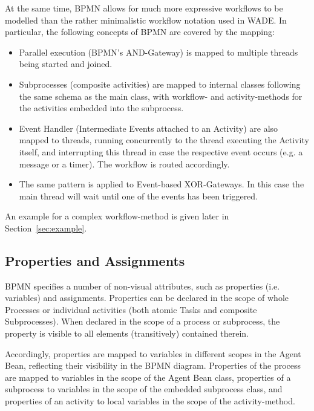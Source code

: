 At the same time, BPMN allows for much more expressive workflows to be modelled
than the rather minimalistic workflow notation used in WADE.  In particular, the
following concepts of BPMN are covered by the mapping:

\begin{itemize}
	\item Parallel execution (BPMN's AND-Gateway) is mapped to multiple threads
	being started and joined.
	
	\item Subprocesses (composite activities) are mapped to internal classes
	following the same schema as the main class, with workflow- and activity-methods
	for the activities embedded into the subprocess.

	\item Event Handler (Intermediate Events attached to an Activity) are also
	mapped to threads, running concurrently to the thread executing the Activity
	itself, and interrupting this thread in case the respective event occurs (e.g.
	a message or a timer).  The workflow is routed accordingly.
	
	\item The same pattern is applied to Event-based XOR-Gateways.  In this case
	the main thread will wait until one of the events has been triggered.
\end{itemize}

An example for a complex workflow-method is given later in Section~\ref{sec:example}.



\subsection{Properties and Assignments}

BPMN specifies a number of non-visual attributes, such as properties (i.e.
variables) and assignments.  Properties can be declared in the scope of whole
Processes or individual activities (both atomic Tasks and composite Subprocesses).
When declared in the scope of a process or subprocess, the property is visible to
all elements (transitively) contained therein.

Accordingly, properties are mapped to variables in different scopes in the Agent
Bean, reflecting their visibility in the BPMN diagram.  Properties of the process
are mapped to variables in the scope of the Agent Bean class, properties of a
subprocess to variables in the scope of the embedded subprocess class, and
properties of an activity to local variables in the scope of the activity-method.

